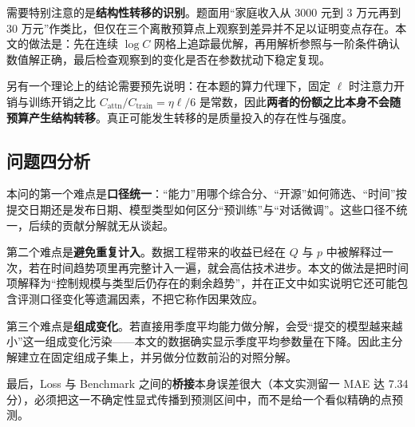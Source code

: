 需要特别注意的是\textbf{结构性转移的识别}。题面用``家庭收入从 3000 元到 3 万元再到 30 万元''作类比，但仅在三个离散预算点上观察到差异并不足以证明变点存在。本文的做法是：先在连续 $\log C$ 网格上追踪最优解，再用解析参照与一阶条件确认数值解正确，最后检查观察到的变化是否在参数扰动下稳定复现。

另有一个理论上的结论需要预先说明：在本题的算力代理下，固定 $\ell$ 时注意力开销与训练开销之比 $C_{\mathrm{attn}}/C_{\mathrm{train}}=\eta\ell/6$ 是常数，因此\textbf{两者的份额之比本身不会随预算产生结构转移}。真正可能发生转移的是质量投入的存在性与强度。

\subsection{问题四分析}

本问的第一个难点是\textbf{口径统一}：``能力''用哪个综合分、``开源''如何筛选、``时间''按提交日期还是发布日期、模型类型如何区分``预训练''与``对话微调''。这些口径不统一，后续的贡献分解就无从谈起。

第二个难点是\textbf{避免重复计入}。数据工程带来的收益已经在 $Q$ 与 $p$ 中被解释过一次，若在时间趋势项里再完整计入一遍，就会高估技术进步。本文的做法是把时间项解释为``控制规模与类型后仍存在的剩余趋势''，并在正文中如实说明它还可能包含评测口径变化等遗漏因素，不把它称作因果效应。

第三个难点是\textbf{组成变化}。若直接用季度平均能力做分解，会受``提交的模型越来越小''这一组成变化污染——本文的数据确实显示季度平均参数量在下降。因此主分解建立在固定组成子集上，并另做分位数前沿的对照分解。

最后，Loss 与 Benchmark 之间的\textbf{桥接}本身误差很大（本文实测留一 MAE 达 7.34 分），必须把这一不确定性显式传播到预测区间中，而不是给一个看似精确的点预测。
